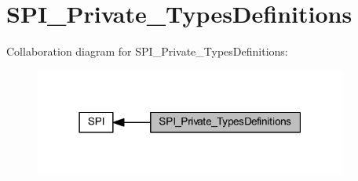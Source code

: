 \hypertarget{group___s_p_i___private___types_definitions}{}\section{S\+P\+I\+\_\+\+Private\+\_\+\+Types\+Definitions}
\label{group___s_p_i___private___types_definitions}
Collaboration diagram for S\+P\+I\+\_\+\+Private\+\_\+\+Types\+Definitions\+:
\nopagebreak
\begin{figure}[H]
\begin{center}
\leavevmode
\includegraphics[width=291pt]{group___s_p_i___private___types_definitions}
\end{center}
\end{figure}
